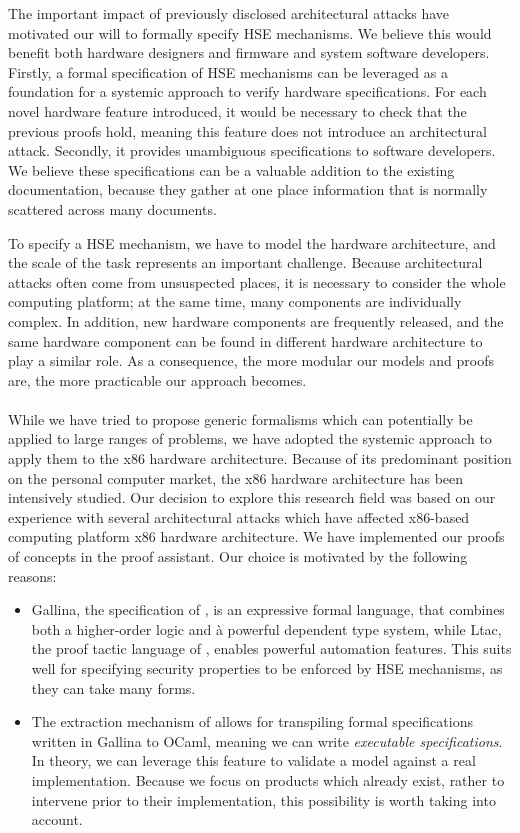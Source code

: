 The important impact of previously disclosed architectural attacks have
motivated our will to formally specify HSE mechanisms.
%
We believe this would benefit both hardware designers and firmware and system
software developers.
%
Firstly, a formal specification of HSE mechanisms can be leveraged as a
foundation for a systemic approach to verify hardware specifications.
%
For each novel hardware feature introduced, it would be necessary to check that
the previous proofs hold, meaning this feature does not introduce an
architectural attack.
%
Secondly, it provides unambiguous specifications to software developers.
%
We believe these specifications can be a valuable addition to the existing
documentation, because they gather at one place information that is normally
scattered across many documents.

To specify a HSE mechanism, we have to model the hardware architecture, and the
scale of the task represents an important challenge.
%
Because architectural attacks often come from unsuspected places, it is
necessary to consider the whole computing platform; at the same time, many
components are individually complex.
%
In addition, new hardware components are frequently released, and the same
hardware component can be found in different hardware architecture to play a
similar role.
%
As a consequence, the more modular our models and proofs are, the more
practicable our approach becomes.

\paragraph{}
%
While we have tried to propose generic formalisms which can potentially be
applied to large ranges of problems, we have adopted the systemic approach to
apply them to the x86 hardware architecture.
%
Because of its predominant position on the personal computer market, the x86
hardware architecture has been intensively studied.
%
Our decision to explore this research field was based on our experience with
several architectural attacks which have affected x86-based computing platform
x86 hardware architecture.
%
We have implemented our proofs of concepts in the  proof assistant.
%
Our choice is motivated by the following reasons:
%
\begin{itemize}
\item {\sc Gallina}, the specification of , is an expressive formal language,
  that combines both a higher-order logic and à powerful dependent type system,
  while {\sc Ltac}, the proof tactic language of , enables powerful
  automation features.
  This suits well for specifying security properties to be enforced by HSE
  mechanisms, as they can take many forms.
\item The extraction mechanism of  allows for transpiling formal
  specifications written in {\sc Gallina} to OCaml, meaning we can write
  \emph{executable specifications}.
  In theory, we can leverage this feature to validate a model against a real
  implementation.
  Because we focus on products which already exist, rather to intervene prior to
  their implementation, this possibility is worth taking into account.
\end{itemize}

